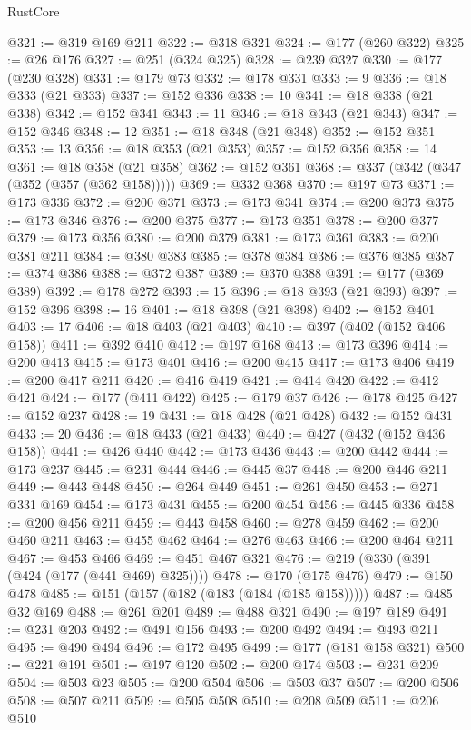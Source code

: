 \begin{lexlean}{RustCore}
\begin{coremodule}
@321 := @319 @169 @211
@322 := @318 @321
@324 := @177 (@260 @322)
@325 := @26 @176
@327 := @251 (@324 @325)
@328 := @239 @327
@330 := @177 (@230 @328)
@331 := @179 @73
@332 := @178 @331
@333 := 9
@336 := @18 @333 (@21 @333)
@337 := @152 @336
@338 := 10
@341 := @18 @338 (@21 @338)
@342 := @152 @341
@343 := 11
@346 := @18 @343 (@21 @343)
@347 := @152 @346
@348 := 12
@351 := @18 @348 (@21 @348)
@352 := @152 @351
@353 := 13
@356 := @18 @353 (@21 @353)
@357 := @152 @356
@358 := 14
@361 := @18 @358 (@21 @358)
@362 := @152 @361
@368 := @337 (@342 (@347 (@352 (@357 (@362 @158)))))
@369 := @332 @368
@370 := @197 @73
@371 := @173 @336
@372 := @200 @371
@373 := @173 @341
@374 := @200 @373
@375 := @173 @346
@376 := @200 @375
@377 := @173 @351
@378 := @200 @377
@379 := @173 @356
@380 := @200 @379
@381 := @173 @361
@383 := @200 @381 @211
@384 := @380 @383
@385 := @378 @384
@386 := @376 @385
@387 := @374 @386
@388 := @372 @387
@389 := @370 @388
@391 := @177 (@369 @389)
@392 := @178 @272
@393 := 15
@396 := @18 @393 (@21 @393)
@397 := @152 @396
@398 := 16
@401 := @18 @398 (@21 @398)
@402 := @152 @401
@403 := 17
@406 := @18 @403 (@21 @403)
@410 := @397 (@402 (@152 @406 @158))
@411 := @392 @410
@412 := @197 @168
@413 := @173 @396
@414 := @200 @413
@415 := @173 @401
@416 := @200 @415
@417 := @173 @406
@419 := @200 @417 @211
@420 := @416 @419
@421 := @414 @420
@422 := @412 @421
@424 := @177 (@411 @422)
@425 := @179 @37
@426 := @178 @425
@427 := @152 @237
@428 := 19
@431 := @18 @428 (@21 @428)
@432 := @152 @431
@433 := 20
@436 := @18 @433 (@21 @433)
@440 := @427 (@432 (@152 @436 @158))
@441 := @426 @440
@442 := @173 @436
@443 := @200 @442
@444 := @173 @237
@445 := @231 @444
@446 := @445 @37
@448 := @200 @446 @211
@449 := @443 @448
@450 := @264 @449
@451 := @261 @450
@453 := @271 @331 @169
@454 := @173 @431
@455 := @200 @454
@456 := @445 @336
@458 := @200 @456 @211
@459 := @443 @458
@460 := @278 @459
@462 := @200 @460 @211
@463 := @455 @462
@464 := @276 @463
@466 := @200 @464 @211
@467 := @453 @466
@469 := @451 @467 @321
@476 := @219 (@330 (@391 (@424 (@177 (@441 @469) @325))))
@478 := @170 (@175 @476)
@479 := @150 @478
@485 := @151 (@157 (@182 (@183 (@184 (@185 @158)))))
@487 := @485 @32 @169
@488 := @261 @201
@489 := @488 @321
@490 := @197 @189
@491 := @231 @203
@492 := @491 @156
@493 := @200 @492
@494 := @493 @211
@495 := @490 @494
@496 := @172 @495
@499 := @177 (@181 @158 @321)
@500 := @221 @191
@501 := @197 @120
@502 := @200 @174
@503 := @231 @209
@504 := @503 @23
@505 := @200 @504
@506 := @503 @37
@507 := @200 @506
@508 := @507 @211
@509 := @505 @508
@510 := @208 @509
@511 := @206 @510

\end{coremodule}
\end{lexlean}
